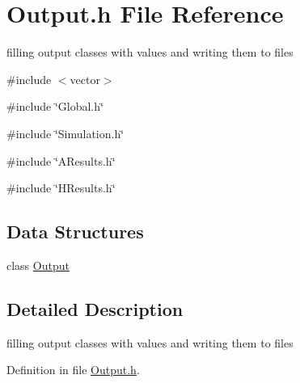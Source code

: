 \section{Output.h File Reference}
\label{Output_8h}


filling output classes with values and writing them to files  


{\ttfamily \#include $<$vector$>$}\par
{\ttfamily \#include \char`\"{}Global.h\char`\"{}}\par
{\ttfamily \#include \char`\"{}Simulation.h\char`\"{}}\par
{\ttfamily \#include \char`\"{}AResults.h\char`\"{}}\par
{\ttfamily \#include \char`\"{}HResults.h\char`\"{}}\par
\subsection*{Data Structures}
\begin{DoxyCompactItemize}
\item 
class \hyperlink{classOutput}{Output}
\end{DoxyCompactItemize}


\subsection{Detailed Description}
filling output classes with values and writing them to files 

Definition in file \hyperlink{Output_8h_source}{Output.h}.

